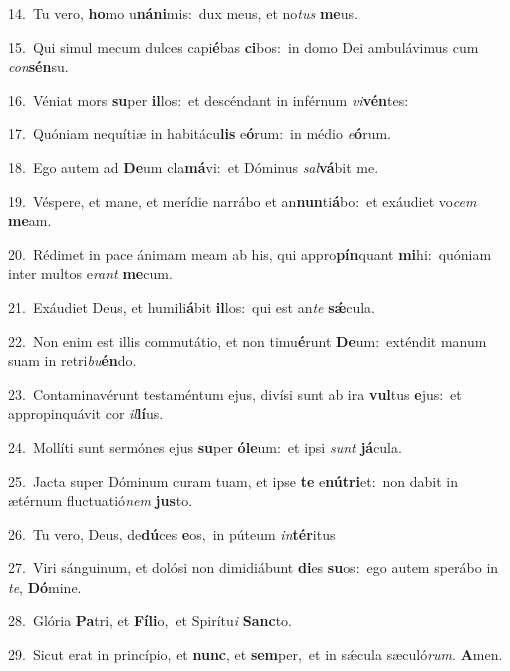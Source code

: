 {\numbfont\textcolor{\numbcolor}{14.}}~Tu vero, \textbf{ho}\-mo u\-\textbf{ná}\-\textbf{ni}mis:~\star dux meus, et no\textit{tus} \textbf{me}\-us.\par
{\numbfont\textcolor{\numbcolor}{15.}}~Qui simul mecum dulces capi\-\textbf{é}\-bas \textbf{ci}\-bos:~\star in domo Dei ambulávimus cum \textit{con}\-\textbf{sén}su.\par
{\numbfont\textcolor{\numbcolor}{16.}}~Véniat mors \textbf{su}\-per \textbf{il}\-los:~\star et descéndant in inférnum \textit{vi}\-\textbf{vén}tes:\par
{\numbfont\textcolor{\numbcolor}{17.}}~Quóniam nequítiæ in habitácu\textbf{lis} e\-\textbf{ó}\-rum:~\star in médio \textit{e}\-\textbf{ó}rum.\par
{\numbfont\textcolor{\numbcolor}{18.}}~Ego autem ad \textbf{De}\-um cla\-\textbf{má}\-vi:~\star et Dóminus \textit{sal}\-\textbf{vá}bit me.\par
{\numbfont\textcolor{\numbcolor}{19.}}~Véspere, et mane, et merídie narrábo et an\-\textbf{nun}\-ti\-\textbf{á}\-bo:~\star et exáudiet vo\textit{cem} \textbf{me}\-am.\par
{\numbfont\textcolor{\numbcolor}{20.}}~Rédimet in pace ánimam meam ab his, qui appro\-\textbf{pín}\-quant \textbf{mi}\-hi:~\star quóniam inter multos e\textit{rant} \textbf{me}\-cum.\par
{\numbfont\textcolor{\numbcolor}{21.}}~Exáudiet Deus, et humili\-\textbf{á}\-bit \textbf{il}\-los:~\star qui est an\textit{te} \textbf{sǽ}\-cula.\par
{\numbfont\textcolor{\numbcolor}{22.}}~Non enim est illis commutátio, et non timu\-\textbf{é}\-runt \textbf{De}\-um:~\star exténdit manum suam in retri\-\textit{bu}\-\textbf{én}do.\par
{\numbfont\textcolor{\numbcolor}{23.}}~Contaminavérunt testaméntum ejus, divísi sunt ab ira \textbf{vul}\-tus \textbf{e}\-jus:~\star et appropinquávit cor \textit{il}\-\textbf{lí}us.\par
{\numbfont\textcolor{\numbcolor}{24.}}~Mollíti sunt sermónes ejus \textbf{su}\-per \textbf{ó}\-\textbf{le}um:~\star et ipsi \textit{sunt} \textbf{já}\-cula.\par
{\numbfont\textcolor{\numbcolor}{25.}}~Jacta super Dóminum curam tuam, et ipse \textbf{te} e\-\textbf{nú}\-\textbf{tri}et:~\star non dabit in ætérnum fluctuatió\textit{nem} \textbf{jus}\-to.\par
{\numbfont\textcolor{\numbcolor}{26.}}~Tu vero, Deus, de\-\textbf{dú}\-ces \textbf{e}\-os,~\star in púteum \textit{in}\-\textbf{tér}itus\par
{\numbfont\textcolor{\numbcolor}{27.}}~Viri sánguinum, et dolósi non dimidiábunt \textbf{di}\-es \textbf{su}\-os:~\star ego autem sperábo in \textit{te}\-, \textbf{Dó}\-mine.\par
{\numbfont\textcolor{\numbcolor}{28.}}~Glória \textbf{Pa}\-tri, et \textbf{Fí}\-\textbf{li}o,~\star et Spirítu\textit{i} \textbf{Sanc}\-to.\par
{\numbfont\textcolor{\numbcolor}{29.}}~Sicut erat in princípio, et \textbf{nunc}\-, et \textbf{sem}\-per,~\star et in sǽcula sæculó\-\textit{rum}\-. \textbf{A}\-men.\par
